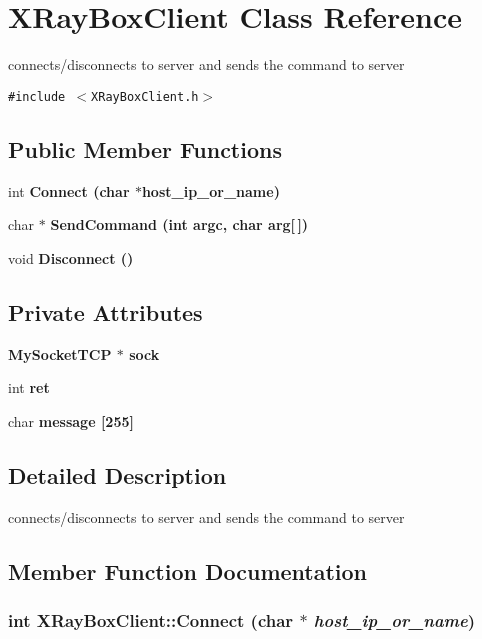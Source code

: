 \section{XRay\-Box\-Client Class Reference}
\label{classXRayBoxClient}
connects/disconnects to server and sends the command to server  


{\tt \#include $<$XRay\-Box\-Client.h$>$}

\subsection*{Public Member Functions}
\begin{CompactItemize}
\item 
int \bf{Connect} (char $\ast$host\_\-ip\_\-or\_\-name)
\item 
char $\ast$ \bf{Send\-Command} (int argc, char arg[$\,$])
\item 
void \bf{Disconnect} ()
\end{CompactItemize}
\subsection*{Private Attributes}
\begin{CompactItemize}
\item 
\bf{My\-Socket\-TCP} $\ast$ \bf{sock}
\item 
int \bf{ret}
\item 
char \bf{message} [255]
\end{CompactItemize}


\subsection{Detailed Description}
connects/disconnects to server and sends the command to server 



\subsection{Member Function Documentation}
\subsubsection{\setlength{\rightskip}{0pt plus 5cm}int XRay\-Box\-Client::Connect (char $\ast$ {\em host\_\-ip\_\-or\_\-name})}\label{classXRayBoxClient_7bc8b1afd8aecaf49593f8ea4e6c8d17}


